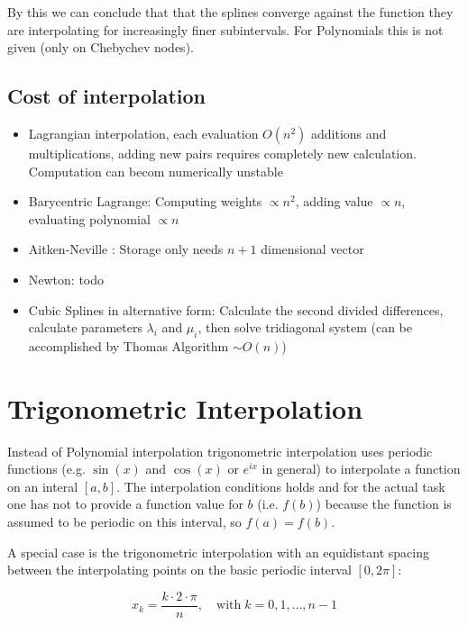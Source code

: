 \documentclass[
    a4paper,
    11pt
]{article}
\begin{document}
By this we can conclude that that the splines converge against the function they
are interpolating for increasingly finer subintervals. For Polynomials this is
not given (only on Chebychev nodes).

\subsection{Cost of interpolation}

\begin{itemize}
    \item Lagrangian interpolation, each evaluation $O(n^2)$ additions and
        multiplications, adding new pairs requires completely new calculation.
        Computation can becom numerically unstable
    \item Barycentric Lagrange: Computing weights $\propto n^2$, adding value
        $\propto n$, evaluating polynomial $\propto n$
    \item Aitken-Neville : Storage only needs $n+1$ dimensional vector
    \item Newton: todo
    \item Cubic Splines in alternative form: Calculate the second divided
        differences, calculate parameters $\lambda_i$ and $\mu_i$, then solve
        tridiagonal system (can be accomplished by Thomas Algorithm $\sim O(n)$)
\end{itemize}


\section{Trigonometric Interpolation}

Instead of Polynomial interpolation trigonometric interpolation uses periodic
functions (e.g. $\sin(x)$ and $\cos(x)$ or $e^{ix}$ in general) to interpolate a
function on an interal $[a, b]$. The interpolation conditions holds and for the
actual task one has not to provide a function value for $b$ (i.e. $f(b)$)
because the function is assumed to be periodic on this interval, so $f(a) =
f(b)$.

A special case is the trigonometric interpolation with an equidistant spacing
between the interpolating points on the basic periodic interval $[0, 2\pi]$:

\begin{equation}
    x_k = \frac{k\cdot 2 \cdot \pi}{n}, \quad \text{with} \; k=0, 1, \dots, n-1
\end{equation}
\end{document}
